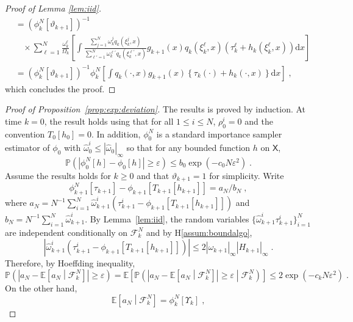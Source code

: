 \documentclass[12pt]{article}
\newcommand{\rmd}{\mathrm{d}}
\newcommand{\eqsp}{\;}
\newcommand{\1}{\mathrm{1}}
\newcommand{\qk}{q_{k}}
\begin{document}
\begin{proof}[Proof of Lemma \ref{lem:iid}]
\begin{align*}
&= \left(\phi^N_{k}[\vartheta_{k+1}]\right)^{-1}\\
&~~~~\times\sum_{\ell=1}^N \frac{\omega_k^\ell}{\Omega_k}\left[\int \frac{ \sum_{j=1}^N \omega_k^j\qk(\xi_k^j,x) }{ \sum_{\ell'=1}^N\omega_k^{\ell'}\qk(\xi_{k}^{\ell'},x) } g_{k+1}(x)\qk (\xi_{k}^{\ell},x)\left(\tau^{\ell}_k + h_{k}(\xi_{k}^{\ell},x)\right) \rmd x \right]\\ 
& =\left(\phi^N_{k}[\vartheta_{k+1}]\right)^{-1}\phi^N_{k}\left[\int \qk(\cdot,x)g_{k+1}(x)\left\{\tau_k(\cdot) + h_{k}(\cdot,x)\right\}\rmd x\right]\eqsp,
\end{align*}
which concludes the proof.
\end{proof}


\begin{proof}[Proof of Proposition~\ref{prop:exp:deviation}]
The results is proved by induction. At time $k=0$, the result holds using that for all $1\le i \le N$, $\rho_0^i = 0$ and the convention $T_0[h_0] =0$. In addition, $\phi_0^N$ is a standard importance sampler estimator of $\phi_0$ with $\widehat \omega_0^i\le |\widehat{\omega}_0|_{\infty}$ so that for any bounded function $h$ on $\mathsf{X}$,
\[
\mathbb{P}\left(\left|\phi_0^N[h] - \phi_0\left[h\right]\right|\ge \varepsilon\right)\le b_0\exp\left(-c_0N\varepsilon^2\right)\eqsp.
\]
Assume the results holds for $k\ge 0$ and that $\vartheta_{k+1} = 1$ for simplicity. Write
\[
\phi_{k+1}^N[\tau_{k+1}] - \phi_{k+1}\left[T_{k+1}[h_{k+1}]\right] = a_N/b_N\eqsp,
\]
where $a_N = N^{-1}\sum_{i=1}^N \widehat{\omega}_{k+1}^i \left(\tau_{k+1}^i - \phi_{k+1}\left[T_{k+1}[h_{k+1}]\right]\right)$ and $b_N =N^{-1}\sum_{i=1}^N \widehat{\omega}_{k+1}^i$. By Lemma~\ref{lem:iid}, the random variables $\{\widehat{\omega}_{k+1}^i\tau_{k+1}^i\}_{i=1}^N$ are independent conditionally on $\mathcal{F}_k^{N}$ and by H\ref{assum:boundalgo},
\[
\left|\widehat{\omega}_{k+1}^i \left(\tau_{k+1}^i - \phi_{k+1}\left[T_{k+1}[h_{k+1}]\right]\right)\right| \le 2|\widehat{\omega}_{k+1}|_{\infty}|H_{k+1}|_{\infty}\eqsp.
\]
Therefore, by Hoeffding inequality,
\[
\mathbb{P}\left(\left|a_N - \mathbb{E}\left[a_N\middle|\mathcal{F}_k^{N}\right]\right|\ge \varepsilon\right) = \mathbb{E}\left[\mathbb{P}\left(\left|a_N - \mathbb{E}\left[a_N\middle|\mathcal{F}_k^{N}\right]\right|\ge \varepsilon\middle|\mathcal{F}_k^{N}\right)\right]\le 2\exp\left(-c_kN\varepsilon^2\right)\eqsp.
\] 
On the other hand,
\[
\mathbb{E}\left[a_N\middle|\mathcal{F}_k^{N}\right] = \phi^N_{k}\left[\Upsilon_k\right] \eqsp,
\]
\end{proof}
\end{document}
